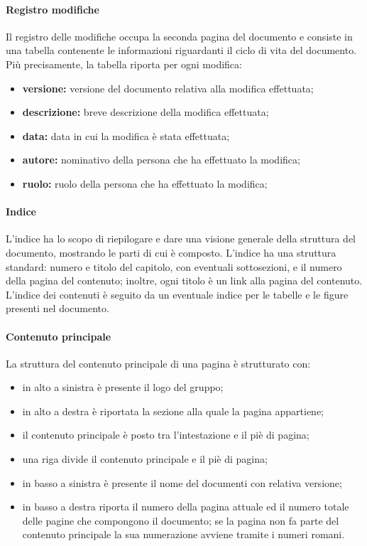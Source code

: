			\paragraph{Registro modifiche}
			\label{par: Registro modifiche}
				Il registro delle modifiche occupa la seconda pagina del documento e consiste in una tabella contenente le informazioni riguardanti il ciclo di vita del documento. Più precisamente, la tabella riporta per ogni modifica:
				\begin{itemize}
					\item \textbf{versione:} versione del documento relativa alla modifica effettuata;
					\item \textbf{descrizione:} breve descrizione della modifica effettuata;
					\item \textbf{data:} data in cui la modifica è stata effettuata;
					\item \textbf{autore:} nominativo della persona che ha effettuato la modifica;
					\item \textbf{ruolo:} ruolo della persona che ha effettuato la modifica;
				\end{itemize}
			\paragraph{Indice}
				L'indice ha lo scopo di riepilogare e dare una visione generale della struttura del documento, mostrando le parti di cui è composto. L'indice ha una struttura standard: numero e titolo del capitolo, con eventuali sottosezioni, e il numero della pagina del contenuto; inoltre, ogni titolo è un link alla pagina del contenuto. L'indice dei contenuti è seguito da un eventuale indice per le tabelle e le figure presenti nel documento.
			\paragraph{Contenuto principale}
				La struttura del contenuto principale di una pagina è strutturato con:
					\begin{itemize}
						\item in alto a sinistra è presente il logo del gruppo;
						\item in alto a destra è riportata la sezione alla quale la pagina appartiene;
						\item il contenuto principale è posto tra l'intestazione e il piè di pagina;
						\item una riga divide il contenuto principale e il piè di pagina;
						\item in basso a sinistra è presente il nome del documenti con relativa versione;
						\item in basso a destra riporta il numero della pagina attuale ed il numero totale delle pagine che compongono il documento; se la pagina non fa parte del contenuto principale la sua numerazione avviene tramite i numeri romani.
					\end{itemize}
